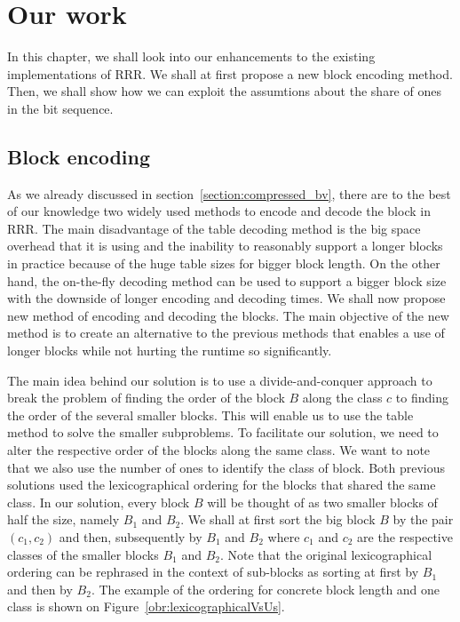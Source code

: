\chapter{Our work}
\label{kap:kap3}

In this chapter, we shall look into our enhancements to the existing
implementations of RRR. We shall at first propose a new block encoding
method. Then, we shall show how we can exploit the assumtions about the
share of ones in the bit sequence.  

\section{Block encoding}

As we already discussed in section~\ref{section:compressed_bv}, there are to
the best of our knowledge two widely used methods to encode and decode the
block in RRR. The main disadvantage of the table decoding method is the big space
overhead that it is using and the inability to reasonably support a longer blocks
in practice because of the huge table sizes for bigger block length. On the
other hand, the on-the-fly decoding method can be used to support a bigger block size
with the downside of longer encoding and decoding times. We shall now propose
new method of encoding and decoding the blocks. The main objective of the new method is
to create an alternative to the previous methods that enables a use of longer blocks
while not hurting the runtime so significantly.

The main idea behind our solution is to use a divide-and-conquer approach to break
the problem of finding the order of the block $B$ along the class $c$ to finding the order
of the several smaller blocks. This will enable us to use the table method to solve the
smaller subproblems. To facilitate our solution, we need to alter the respective order of
the blocks along the same class. We want to note that we also use the number of ones to
identify the class of block. Both previous solutions used the lexicographical ordering
for the blocks that shared the same class. In our solution, every block $B$ will be thought
of as two smaller blocks of half the size, namely $B_1$ and $B_2$. We shall at first sort the
big block $B$ by the pair $(c_1, c_2)$ and then, subsequently by $B_1$ and $B_2$ where $c_1$
and $c_2$ are the respective classes of the smaller blocks $B_1$ and $B_2$. Note that the
original lexicographical ordering can be rephrased in the context of sub-blocks as sorting
at first by $B_1$ and then by $B_2$. The example of the ordering for concrete block length
and one class is shown on Figure~\ref{obr:lexicographicalVsUs}.

